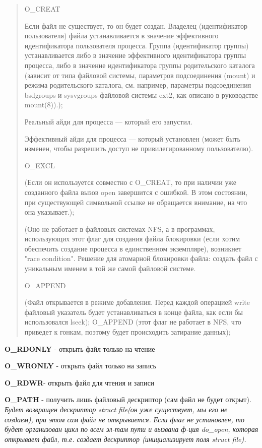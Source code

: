 \begin{quote}

O\_CREAT

Если файл не существует, то он будет создан. Владелец (идентификатор пользователя) файла устанавливается в значение эффективного идентификатора пользователя процесса. Группа (идентификатор группы) устанавливается либо в значение эффективного идентификатора группы процесса, либо в значение идентификатора группы родительского каталога (зависит от типа файловой системы, параметров подсоединения (mount) и режима родительского каталога, см. например, параметры подсоединения bsdgroups и sysvgroups файловой системы ext2, как описано в руководстве mount(8)).);

Реальный айди для процесса --- который его запустил.

Эффективный айди для процесса --- который установлен (может быть изменен, чтобы разрешить доступ не привилегированному пользователю).

O\_EXCL

(Если он используется совместно с O\_CREAT, то при наличии уже созданного файла вызов open завершится с ошибкой. В этом состоянии, при существующей символьной ссылке не обращается внимание, на что она указывает.);

(Оно не работает в файловых системах NFS, а в программах, использующих этот флаг для создания файла блокировки (если хотим обеспечить создание процесса в единственном экземпляре), возникнет "race condition". Решение для атомарной блокировки файла: создать файл с уникальным именем в той же самой файловой системе.

O\_APPEND

(Файл открывается в режиме добавления. Перед каждой операцией write файловый указатель будет устанавливаться в конце файла, как если бы использовался lseek); O\_APPEND (этот флаг не работает в NFS, что приведет к гонкам, поэтому будет происходить затирание данных);

\end{quote}

\textbf{O\_RDONLY} - открыть файл только на чтение

\textbf{O\_WRONLY} - открыть файл только на запись

\textbf{O\_RDWR}- открыть файл для чтения и записи

\textbf{O\_PATH} - получить лишь файловый дескриптор (сам файл не будет открыт). \textit{ Будет возвращен дескриптор struct file(он уже  существует, мы его не создаем), при этом сам файл не открывается. Если флаг не установлен, то будет организован цикл по всем эл-там пути и вызвана ф-ция do\_open, которая открывает файл, т.е. создает дескриптор (инициализирует поля struct file).}


